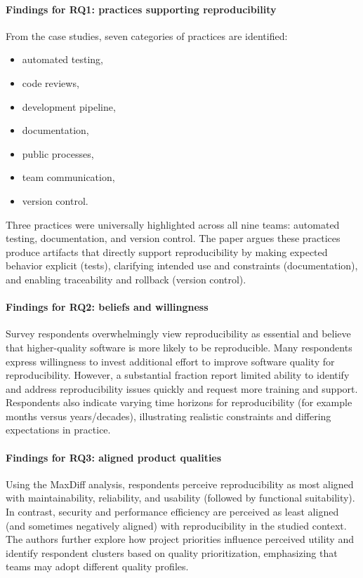 \documentclass[11pt,a4paper]{article}
\begin{document}
\paragraph{Findings for RQ1: practices supporting reproducibility}
From the case studies, seven categories of practices are identified:
\begin{itemize}[leftmargin=*]
  \item automated testing,
  \item code reviews,
  \item development pipeline,
  \item documentation,
  \item public processes,
  \item team communication,
  \item version control.
\end{itemize}
Three practices were universally highlighted across all nine teams: automated testing, documentation, and version control. The paper argues these practices produce artifacts that directly support reproducibility by making expected behavior explicit (tests), clarifying intended use and constraints (documentation), and enabling traceability and rollback (version control).

\paragraph{Findings for RQ2: beliefs and willingness}
Survey respondents overwhelmingly view reproducibility as essential and believe that higher-quality software is more likely to be reproducible. Many respondents express willingness to invest additional effort to improve software quality for reproducibility. However, a substantial fraction report limited ability to identify and address reproducibility issues quickly and request more training and support. Respondents also indicate varying time horizons for reproducibility (for example months versus years/decades), illustrating realistic constraints and differing expectations in practice.

\paragraph{Findings for RQ3: aligned product qualities}
Using the MaxDiff analysis, respondents perceive reproducibility as most aligned with maintainability, reliability, and usability (followed by functional suitability). In contrast, security and performance efficiency are perceived as least aligned (and sometimes negatively aligned) with reproducibility in the studied context. The authors further explore how project priorities influence perceived utility and identify respondent clusters based on quality prioritization, emphasizing that teams may adopt different quality profiles.
\end{document}
